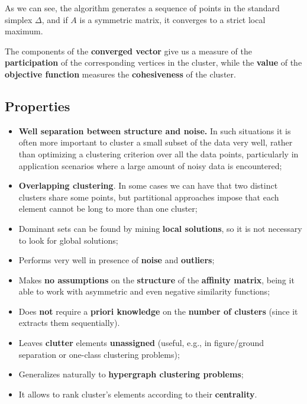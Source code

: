 As we can see, the algorithm generates a sequence of points in the standard simplex $\Delta$, and if $A$ is a symmetric matrix, it converges to a strict local maximum.

The components of the \textbf{converged vector} give us a measure of the \textbf{participation} of the corresponding vertices in the cluster, while the \textbf{value} of the \textbf{objective function} measures the \textbf{cohesiveness} of the cluster.

\subsection{Properties}
\begin{itemize}
	\item \textbf{Well separation between structure and noise.} In such situations it is often more important to cluster a small subset of the data very well, rather than optimizing a clustering criterion over all the data points, particularly in application scenarios where a large amount of noisy data is encountered;
	
	\item \textbf{Overlapping clustering}. In some cases we can have that two distinct clusters share some points, but partitional approaches impose that each element cannot be long to more than one cluster;
	
	\item Dominant sets can be found by mining \textbf{local solutions}, so it is not necessary to look for global solutions;
	
	\item Performs very well in presence of \textbf{noise} and \textbf{outliers};
		
	\item Makes \textbf{no assumptions} on the \textbf{structure} of the \textbf{affinity matrix}, being it able to work with asymmetric and even negative similarity functions;
	
	\item Does \textbf{not} require a \textbf{priori knowledge} on the \textbf{number of clusters} (since it extracts them sequentially).
	
	\item Leaves \textbf{clutter} elements \textbf{unassigned} (useful, e.g., in figure/ground separation or one-class clustering problems);
	
	\item Generalizes naturally to \textbf{hypergraph clustering problems};

        \item It allows to rank cluster's elements according to their \textbf{centrality}.
\end{itemize}

